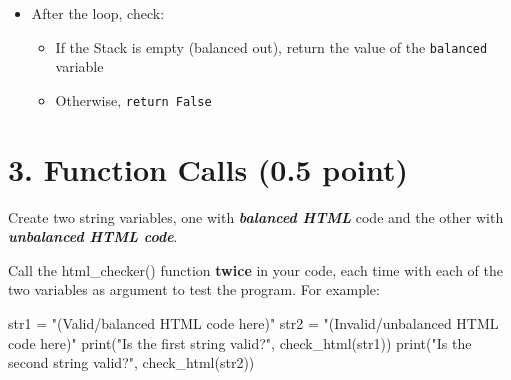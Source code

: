 \documentclass[
  letterpaper,
]{scrbook}
\newenvironment{Shaded}{\begin{snugshade}}{\end{snugshade}}
\newcommand{\BuiltInTok}[1]{\textcolor[rgb]{0.00,0.23,0.31}{#1}}
\newcommand{\NormalTok}[1]{\textcolor[rgb]{0.00,0.23,0.31}{#1}}
\newcommand{\OperatorTok}[1]{\textcolor[rgb]{0.37,0.37,0.37}{#1}}
\newcommand{\StringTok}[1]{\textcolor[rgb]{0.13,0.47,0.30}{#1}}
\providecommand{\tightlist}{%
  \setlength{\itemsep}{0pt}\setlength{\parskip}{0pt}}
\begin{document}
\begin{itemize}
\begin{itemize}
\begin{itemize}
      \begin{itemize}
      \item
        Again, use the \texttt{replace()} method of the text line string
        variable to remove symbols \texttt{\textless{}/\textgreater{}},
        to reduce it to its tag name only;
      \item
        If the top (last) tag matches (\texttt{==}) the current closing
        tag, then the HTML code is balanced (True);
      \item
        Otherwise, the HTML code is unbalanced (False).
      \end{itemize}
    \end{itemize}
  \item
    If the text line is ordinary content without a HTML tag, skip the
    line;

    \begin{itemize}
    \tightlist
    \item
      You do not actually need to do anything in this case.
    \end{itemize}
  \end{itemize}
\item
  After the loop, check:

  \begin{itemize}
  \tightlist
  \item
    If the Stack is empty (balanced out), return the value of the
    \texttt{balanced} variable
  \item
    Otherwise, \texttt{return\ False}
  \end{itemize}
\end{itemize}

\section*{3. Function Calls (0.5 point)}\label{function-calls-0.5-point}


Create two string variables, one with \textbf{\emph{balanced HTML}} code
and the other with \textbf{\emph{unbalanced HTML code}}.

Call the html\_checker() function \textbf{twice} in your code, each time
with each of the two variables as argument to test the program. For
example:

\begin{Shaded}
\begin{Highlighting}[]
\NormalTok{str1 }\OperatorTok{=} \StringTok{"(Valid/balanced HTML code here)"}
\NormalTok{str2 }\OperatorTok{=} \StringTok{"(Invalid/unbalanced HTML code here)"}
\BuiltInTok{print}\NormalTok{(}\StringTok{"Is the first string valid?"}\NormalTok{, check\_html(str1))}
\BuiltInTok{print}\NormalTok{(}\StringTok{"Is the second string valid?"}\NormalTok{, check\_html(str2))}
\end{Highlighting}
\end{Shaded}
\end{document}

